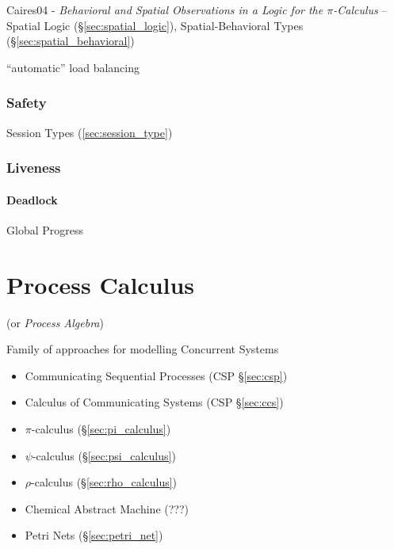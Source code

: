 Caires04 - \emph{Behavioral and Spatial Observations in a Logic for the
  $\pi$-Calculus} -- Spatial Logic (\S\ref{sec:spatial_logic}),
Spatial-Behavioral Types (\S\ref{sec:spatial_behavioral})

``automatic'' load balancing



\subsubsection{Safety}\label{sec:safety}

\fist Session Types (\ref{sec:session_type})



\subsubsection{Liveness}\label{sec:liveness}

\paragraph{Deadlock}\label{sec:deadlock}\hfill

Global Progress



\section{Process Calculus}\label{sec:process_calculus}

(or \emph{Process Algebra})

Family of approaches for modelling Concurrent Systems

\begin{itemize}
\item Communicating Sequential Processes (CSP \S\ref{sec:csp})
\item Calculus of Communicating Systems (CSP \S\ref{sec:ccs})
\item $\pi$-calculus (\S\ref{sec:pi_calculus})
\item $\psi$-calculus (\S\ref{sec:psi_calculus})
\item $\rho$-calculus (\S\ref{sec:rho_calculus})
\item Chemical Abstract Machine (???)
\item Petri Nets (\S\ref{sec:petri_net})
\end{itemize}

